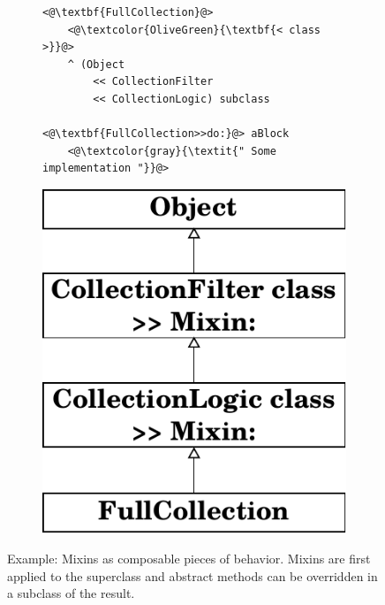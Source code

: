 \begin{figure}[!htp]
\centering
\begin{subfigure}[b]{0.6\textwidth}
\begin{lstlisting}
<@\textbf{FullCollection}@>
    <@\textcolor{OliveGreen}{\textbf{< class >}}@>
    ^ (Object 
        << CollectionFilter 
        << CollectionLogic) subclass

<@\textbf{FullCollection>>do:}@> aBlock
    <@\textcolor{gray}{\textit{" Some implementation "}}@>
\end{lstlisting}
\end{subfigure}
\qquad
\begin{subfigure}[b]{0.25\textwidth}
    \includegraphics[width=\textwidth]{usecase_classgen_v2.pdf}
\end{subfigure}
\caption[Example: Mixins as composable pieces of behavior]{Example: Mixins as composable pieces of behavior. Mixins are first applied to the superclass and abstract methods can be overridden in a subclass of the result.}
\label{fig:mixin_composable}
\end{figure}


